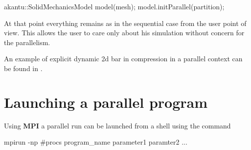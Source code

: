 \begin{cpp}
  akantu::SolidMechanicsModel model(mesh);
  model.initParallel(partition);
\end{cpp} 

At that point everything remains as in the sequential case from 
the user point of view. This allows the user to care only 
about his simulation without concern for the parallelism.

An example of explicit dynamic 2d bar in compression in a parallel
context can be found in .

\section{Launching a parallel program}

Using \textbf{MPI} a parallel run can be launched from a shell 
using the command 

\begin{cpp}
  mpirun -np #procs program_name parameter1 paramter2 ...
\end{cpp} 
